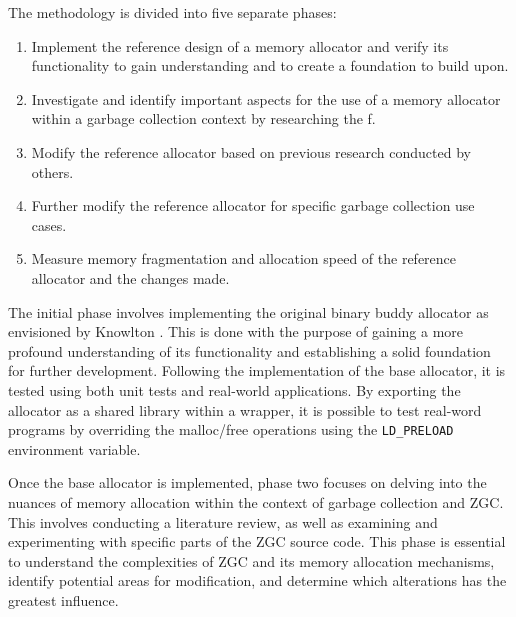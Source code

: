 The methodology is divided into five separate phases:

\begin{enumerate}
    \item Implement the reference design of a memory allocator and verify its functionality to gain understanding and to create a foundation to build upon.
    \item Investigate and identify important aspects for the use of a memory allocator within a garbage collection context by researching the f.
    \item Modify the reference allocator based on previous research conducted by others.
    \item Further modify the reference allocator for specific garbage collection use cases.
    \item Measure memory fragmentation and allocation speed of the reference allocator and the changes made.
\end{enumerate}

The initial phase involves implementing the original binary buddy allocator as envisioned by Knowlton \cite{buddy}. This is done with the purpose of gaining a more profound understanding of its functionality and establishing a solid foundation for further development. Following the implementation of the base allocator, it is tested using both unit tests and real-world applications. By exporting the allocator as a shared library within a wrapper, it is possible to test real-word programs by overriding the malloc/free operations using the \texttt{LD\_PRELOAD} environment variable.


Once the base allocator is implemented, phase two focuses on delving into the nuances of memory allocation within the context of garbage collection and ZGC. This involves conducting a literature review, as well as examining and experimenting with specific parts of the ZGC source code. This phase is essential to understand the complexities of ZGC and its memory allocation mechanisms, identify potential areas for modification, and determine which alterations has the greatest influence.


